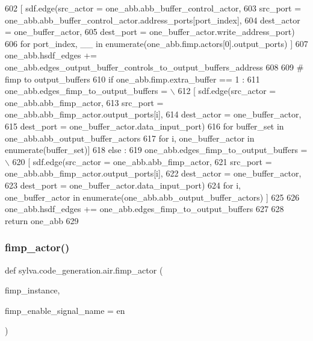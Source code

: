\begin{DoxyCode}
602         [ sdf.edge(src\_actor = one\_abb.abb\_buffer\_control\_actor,
603             src\_port = one\_abb.abb\_buffer\_control\_actor.address\_ports[port\_index],
604             dest\_actor = one\_buffer\_actor,
605             dest\_port = one\_buffer\_actor.write\_address\_port)
606          \textcolor{keywordflow}{for} port\_index, \_\_ \textcolor{keywordflow}{in} enumerate(one\_abb.fimp.actors[0].output\_ports) ]
607     one\_abb.hsdf\_edges += one\_abb.edges\_output\_buffer\_controls\_to\_output\_buffers\_address
608 
609     \textcolor{comment}{# fimp to output\_buffers}
610     \textcolor{keywordflow}{if} one\_abb.fimp.extra\_buffer == 1 :
611       one\_abb.edges\_fimp\_to\_output\_buffers = \(\backslash\)
612         [ sdf.edge(src\_actor = one\_abb.abb\_fimp\_actor,
613             src\_port = one\_abb.abb\_fimp\_actor.output\_ports[i],
614             dest\_actor = one\_buffer\_actor,
615             dest\_port = one\_buffer\_actor.data\_input\_port)
616          \textcolor{keywordflow}{for} buffer\_set \textcolor{keywordflow}{in} one\_abb.abb\_output\_buffer\_actors
617          \textcolor{keywordflow}{for} i, one\_buffer\_actor \textcolor{keywordflow}{in} enumerate(buffer\_set)]
618     \textcolor{keywordflow}{else} :
619       one\_abb.edges\_fimp\_to\_output\_buffers = \(\backslash\)
620         [ sdf.edge(src\_actor = one\_abb.abb\_fimp\_actor,
621             src\_port = one\_abb.abb\_fimp\_actor.output\_ports[i],
622             dest\_actor = one\_buffer\_actor,
623             dest\_port = one\_buffer\_actor.data\_input\_port)
624          \textcolor{keywordflow}{for} i, one\_buffer\_actor \textcolor{keywordflow}{in} enumerate(one\_abb.abb\_output\_buffer\_actors) ]
625 
626     one\_abb.hsdf\_edges += one\_abb.edges\_fimp\_to\_output\_buffers
627 
628   \textcolor{keywordflow}{return} one\_abb
629 
\end{DoxyCode}
\mbox{\label{namespacesylva_1_1code__generation_1_1air_a5a82ebeeb6def57b9dc6784ab9cd43f4}} 
\subsubsection{\texorpdfstring{fimp\+\_\+actor()}{fimp\_actor()}}
{\footnotesize\ttfamily def sylva.\+code\+\_\+generation.\+air.\+fimp\+\_\+actor (\begin{DoxyParamCaption}\item[{}]{fimp\+\_\+instance,  }\item[{}]{fimp\+\_\+enable\+\_\+signal\+\_\+name = {\ttfamily \textquotesingle{}en\textquotesingle{}} }\end{DoxyParamCaption})}



